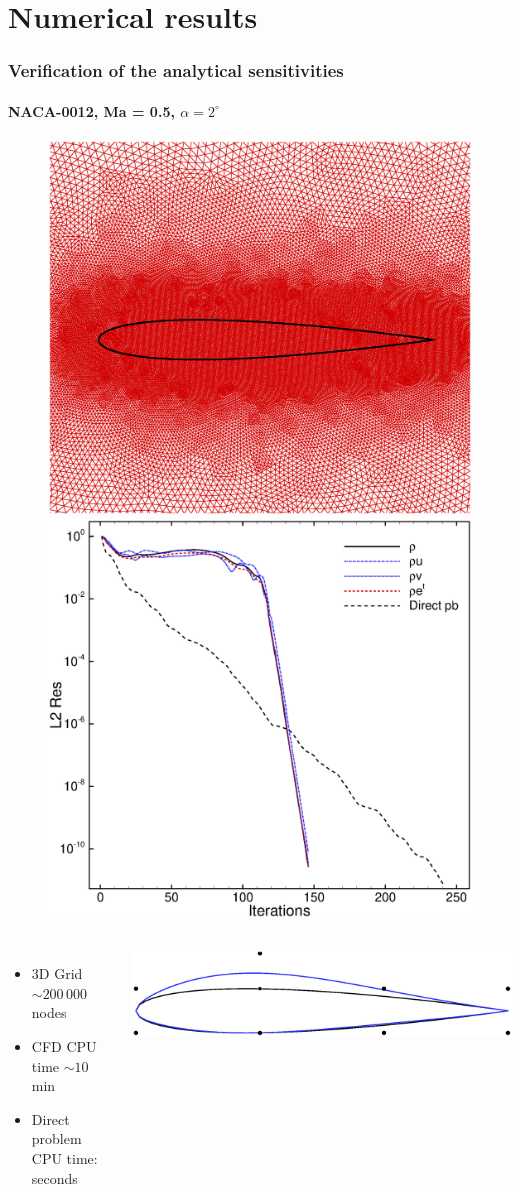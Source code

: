 \section{Numerical results}

\begin{frame}
  \frametitle{Verification of the analytical sensitivities}  
  \framesubtitle{NACA-0012, Ma = 0.5, $\alpha=2^\circ$}
  \vspace{-5mm}
  \begin{figure}[!ht]
    \centering
    \includegraphics[width=0.42\linewidth]{Fig/mesh_naca_sc}
    \hspace{4mm}
    \includegraphics[width=0.43\linewidth]{Fig/res_naca_sc}
  \end{figure}

  \begin{columns}
    \begin{itemize}
    \item 3D Grid $\sim 200\,000$ nodes
    \item CFD CPU time $\sim 10$ min
    \item Direct problem CPU time: seconds
    \end{itemize}
    \includegraphics[width=1.0\linewidth]{Fig/ffd}
  \end{columns}
\end{frame}

